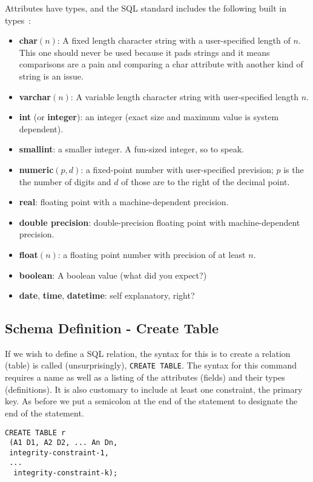 \documentclass[a4paper]{report}
\begin{document}
Attributes have types, and the SQL standard includes the following built in types~\cite{dsc, fds}:

\begin{itemize}
\item \textbf{char}$(n)$: A fixed length character string with a user-specified length of $n$. This one should never be used because it pads strings and it means comparisons are a pain and comparing a char attribute with another kind of string is an issue.
\item \textbf{varchar}$(n)$: A variable length character string with user-specified length $n$.
\item \textbf{int} (or \textbf{integer}): an integer (exact size and maximum value is system dependent).
\item \textbf{smallint}: a smaller integer. A fun-sized integer, so to speak.
\item \textbf{numeric}$(p, d)$: a fixed-point number with user-specified prevision; $p$ is the the number of digits and $d$ of those are to the right of the decimal point.
\item \textbf{real}: floating point with a machine-dependent precision.
\item \textbf{double precision}: double-precision floating point with machine-dependent precision.
\item \textbf{float}$(n)$: a floating point number with precision of at least $n$.
\item \textbf{boolean}: A boolean value (what did you expect?)
\item \textbf{date}, \textbf{time}, \textbf{datetime}: self explanatory, right?
\end{itemize}


\subsection*{Schema Definition - Create Table} 
If we wish to define a SQL relation, the syntax for this is to create a relation (table) is called (unsurprisingly), \texttt{CREATE TABLE}. The syntax for this command requires a name as well as a listing of the attributes (fields) and their types (definitions). It is also customary to include at least one constraint, the primary key. As before we put a semicolon at the end of the statement to designate the end of the statement. 

{\small
\begin{verbatim}
CREATE TABLE r
 (A1 D1, A2 D2, ... An Dn,
 integrity-constraint-1,
 ...
  integrity-constraint-k);
\end{verbatim}
}
\end{document}

